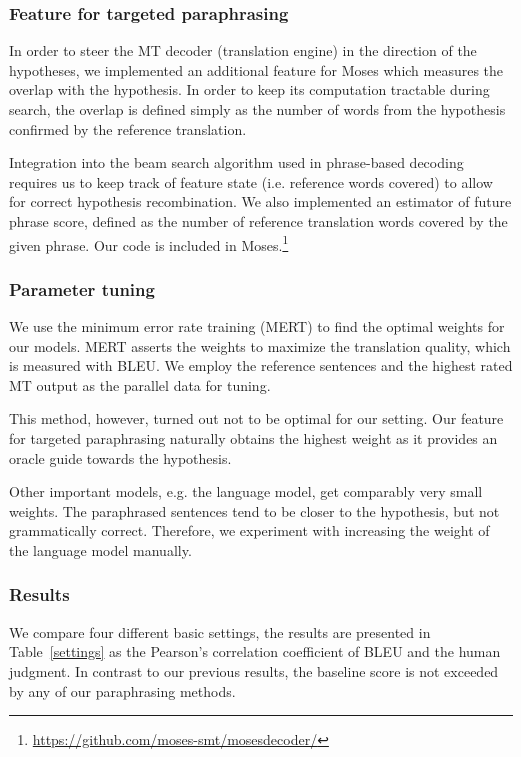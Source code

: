\documentclass[11pt]{article}
\def\Tref#1{Table~\ref{#1}}
\def\Fref#1{Figure~\ref{#1}}
\def\footurl#1{\footnote{\url{#1}}}
\begin{document}
\subsubsection{Feature for targeted paraphrasing}
In order to steer the MT decoder (translation engine) in the direction of the 
hypotheses, we implemented an additional feature for Moses which measures the 
overlap with the hypothesis. In order to keep its computation tractable during 
search, the overlap is defined simply as the number of words from the 
hypothesis confirmed by the reference translation.

Integration into the beam search algorithm used in phrase-based decoding
requires us to keep track of feature state (i.e. reference words covered) to
allow for correct hypothesis recombination. We also implemented an estimator of
future phrase score, defined as the number of reference translation words
covered by the given phrase. Our code is included in
Moses.\footurl{https://github.com/moses-smt/mosesdecoder/}

\subsubsection{Parameter tuning}
We use the minimum error rate training (MERT) \cite{mert} to find the optimal 
weights for our models. MERT asserts the weights to maximize the translation 
quality, which is measured with BLEU. We employ the reference sentences and the 
highest rated MT output as the parallel data for tuning. 

This method, however, turned out not to be optimal for our setting. Our feature 
for targeted paraphrasing naturally obtains the highest weight as it provides 
an oracle guide towards the hypothesis.

Other important models, e.g. the language model, get comparably very small 
weights. The paraphrased sentences tend to be closer to the hypothesis, but not 
grammatically correct. Therefore, we experiment with increasing the weight of 
the language model manually. 

\subsubsection{Results}
We compare four different basic settings, the results are presented in 
\Tref{settings} as the Pearson’s correlation coefficient of BLEU and the human 
judgment. In contrast to  our previous results, the baseline score is not 
exceeded by any of our paraphrasing methods.
\end{document}
